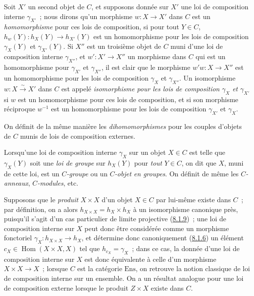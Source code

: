 \begin{env}[8.2.2]
\label{0.8.2.2-fr}
Soit $X'$ un second objet de $C$, et supposons donnée sur $X'$ une loi de
composition interne $\gamma_{X'}$~; nous dirons qu'un morphisme
$w:X\to X'$ dans $C$ est un \emph{homomorphisme} pour ces lois de
composition, si pour tout $Y\in C$, $h_w(Y):h_X(Y)\to h_{X'}(Y)$ est un
homomorphisme pour les lois de composition $\gamma_X(Y)$ et
$\gamma_{X'}(Y)$. Si $X''$ est un troisième
objet de $C$ muni d'une loi de composition interne $\gamma_{X''}$, et
$w':X'\to X''$ un morphisme dans $C$ qui est un homomorphisme pour
$\gamma_{X'}$ et $\gamma_{X''}$, il est clair que le morphisme
$w'w:X\to X''$ est un homomorphisme pour les lois de composition $\gamma_X$
et $\gamma_{X''}$. Un isomorphisme $w:X\xrightarrow{\sim}X'$ dans $C$ est
appelé \emph{isomorphisme pour les lois de composition $\gamma_X$ et
$\gamma_{X'}$} si $w$ est un homomorphisme pour ces lois de composition, et
si son morphisme réciproque $w^{-1}$ est un homomorphisme pour les lois de
composition $\gamma_{X'}$ et $\gamma_X$.

On définit de la même manière les \emph{dihomomorphismes} pour les couples
d'objets de $C$ munis de lois de composition externes.
\end{env}

\begin{env}[8.2.3]
\label{0.8.2.3-fr}
Lorsqu'une loi de composition interne $\gamma_X$ sur un objet $X\in C$ est
telle que $\gamma_X(Y)$ soit une \emph{loi de groupe} sur $h_X(Y)$ pour
\emph{tout} $Y\in C$, on dit que $X$, muni de cette loi, est un
\emph{$C$-groupe} ou un \emph{$C$-objet en groupes}. On définit de même les
\emph{$C$-anneaux}, \emph{$C$-modules}, etc.
\end{env}

\begin{env}[8.2.4]
\label{0.8.2.4-fr}
Supposons que le \emph{produit} $X\times X$ d'un objet $X\in C$ par lui-même
existe dans $C$~; par définition, on a alors
$h_{X\times X}=h_X\times h_X$ à un isomorphisme canonique près, puisqu'il
s'agit d'un cas particulier de limite projective
(\hyperref[0.8.1.9-fr]{8.1.9})~; une loi de composition interne sur $X$ peut
donc être considérée comme un morphisme fonctoriel
$\gamma_X:h_{X\times X}\to h_X$, et détermine donc canoniquement
(\hyperref[0.8.1.6-fr]{8.1.6}) un élément
$c_X\in\operatorname{Hom}(X\times X,X)$ tel que $h_{c_X}=\gamma_X$~; dans
ce cas, la donnée d'une loi de composition interne sur $X$ est donc
équivalente à celle d'un morphisme $X\times X\to X$~; lorsque $C$ est la
catégorie $\mathrm{Ens}$, on retrouve la notion classique de loi de
composition interne sur un ensemble. On a un résultat analogue pour une loi
de composition externe lorsque le produit $Z\times X$ existe dans $C$.
\end{env}

